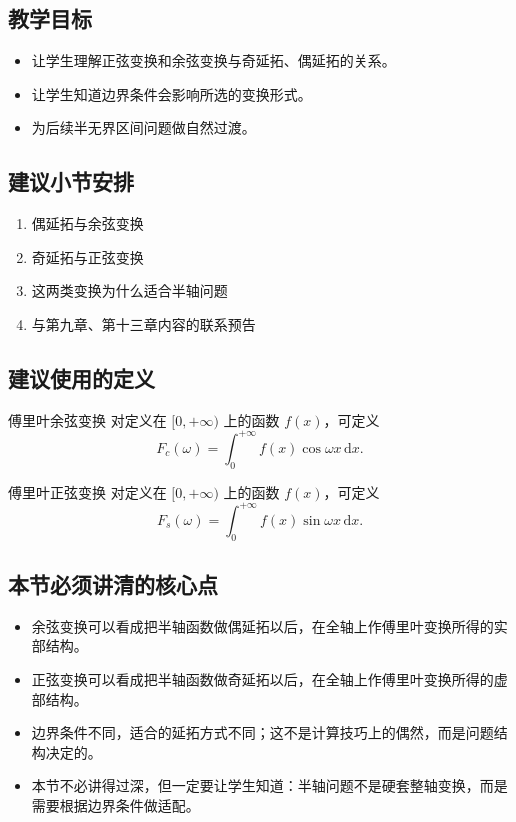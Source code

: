 \subsection*{教学目标}
\begin{itemize}
    \item 让学生理解正弦变换和余弦变换与奇延拓、偶延拓的关系。
    \item 让学生知道边界条件会影响所选的变换形式。
    \item 为后续半无界区间问题做自然过渡。
\end{itemize}

\subsection*{建议小节安排}
\begin{enumerate}
    \item 偶延拓与余弦变换
    \item 奇延拓与正弦变换
    \item 这两类变换为什么适合半轴问题
    \item 与第九章、第十三章内容的联系预告
\end{enumerate}

\subsection*{建议使用的定义}
\begin{dingliyi}{傅里叶余弦变换}{}
对定义在 $[0,+\infty)$ 上的函数 $f(x)$，可定义
\[
    F_c(\omega)=\int_{0}^{+\infty} f(x)\cos \omega x\,\mathrm{d}x.
\]
\end{dingliyi}

\begin{dingliyi}{傅里叶正弦变换}{}
对定义在 $[0,+\infty)$ 上的函数 $f(x)$，可定义
\[
    F_s(\omega)=\int_{0}^{+\infty} f(x)\sin \omega x\,\mathrm{d}x.
\]
\end{dingliyi}

\subsection*{本节必须讲清的核心点}
\begin{itemize}
    \item 余弦变换可以看成把半轴函数做偶延拓以后，在全轴上作傅里叶变换所得的实部结构。
    \item 正弦变换可以看成把半轴函数做奇延拓以后，在全轴上作傅里叶变换所得的虚部结构。
    \item 边界条件不同，适合的延拓方式不同；这不是计算技巧上的偶然，而是问题结构决定的。
    \item 本节不必讲得过深，但一定要让学生知道：半轴问题不是硬套整轴变换，而是需要根据边界条件做适配。
\end{itemize}

